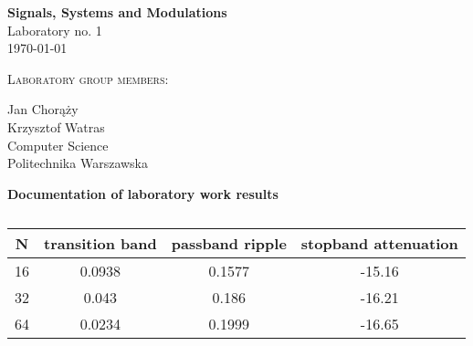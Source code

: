 \documentclass{article}
\begin{document}
\begin{titlepage}
   \begin{center}
       \vspace*{1cm}

       \textbf{\Huge Signals, Systems and Modulations} \\
        \vspace{2.0cm}
        \huge{Laboratory no. 1}
         \vspace{.7cm}
       \huge{\\ \today}

        \vspace{3.0cm}
        \textsc{Laboratory group members:}
        
        \vspace{0.4cm}
        Jan Chorąży\\
         \vspace{0.4cm}
        Krzysztof Watras\\

     
         
        \vspace{2 cm}   
       \small{Computer Science} \\  
       \vspace{0.2cm}       
       \small{Politechnika Warszawska} 
       \date{\today}
            
   \end{center}
\end{titlepage} 

\begin{center}
\textbf{\Large  Documentation of laboratory work results }\\ 
\end{center}

\begin{table}[h!]
  \begin{center}
    \caption{}
    \label{tab:task1tab}
    \begin{tabular}{c|c|c|c} 
      \textbf{N} & \textbf{transition band} & \textbf{passband ripple} 
      & \textbf{stopband attenuation} \\
      \hline
        16 & 0.0938 & 0.1577 & -15.16 \\
        32 & 0.043  & 0.186  & -16.21 \\
        64 & 0.0234 & 0.1999 & -16.65 \\
    \end{tabular}
  \end{center}
\end{table}
\end{document}
